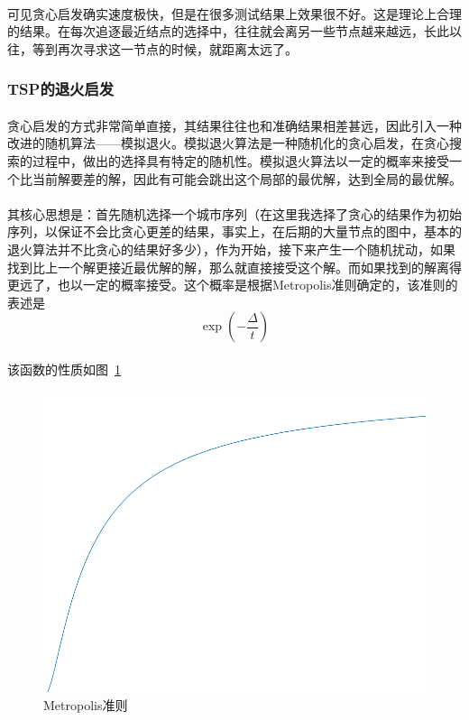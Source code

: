 \documentclass[UTF8,a4paper]{ctexart}
\begin{document}
\paragraph{}可见贪心启发确实速度极快，但是在很多测试结果上效果很不好。这是理论上合理的结果。在每次追逐最近结点的选择中，往往就会离另一些节点越来越远，长此以往，等到再次寻求这一节点的时候，就距离太远了。

\subsubsection{TSP的退火启发}
\paragraph{}贪心启发的方式非常简单直接，其结果往往也和准确结果相差甚远，因此引入一种改进的随机算法——模拟退火。模拟退火算法是一种随机化的贪心启发，在贪心搜索的过程中，做出的选择具有特定的随机性。模拟退火算法以一定的概率来接受一个比当前解要差的解，因此有可能会跳出这个局部的最优解，达到全局的最优解。
\paragraph{}其核心思想是：首先随机选择一个城市序列（在这里我选择了贪心的结果作为初始序列，以保证不会比贪心更差的结果，事实上，在后期的大量节点的图中，基本的退火算法并不比贪心的结果好多少），作为开始，接下来产生一个随机扰动，如果找到比上一个解更接近最优解的解，那么就直接接受这个解。而如果找到的解离得更远了，也以一定的概率接受。这个概率是根据Metropolis准则确定的，该准则的表述是
\[
    \exp\left(-\frac{\Delta}{t}\right)
\]
\paragraph{}该函数的性质如图~\ref{fig:metropolis}
\begin{figure}[htbp]
    \centering
    \includegraphics[scale=0.8]{metropolis.png}
    \caption{Metropolis准则}
    \label{fig:metropolis}
\end{figure}
\end{document}
